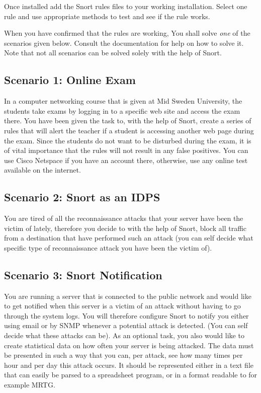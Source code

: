 \documentclass[a4paper,nocourse]{miunasgn}
\begin{document}
Once installed add the Snort rules files to your working installation. 
Select one rule and use appropriate methods to test and see if the rule works.

When you have confirmed that the rules are working, You shall solve \emph{one} 
of the scenarios given below. Consult the documentation \citep{snort} for help 
on how to solve it. Note that not all scenarios can be solved solely with the
help of Snort.

\subsection{Scenario 1: Online Exam}

In a computer networking course that is given at Mid Sweden University, the
students take exams by logging in to a specific web site and access the exam
there. You have been given the task to, with the help of Snort, create a series
of rules that will alert the teacher if a student is accessing another web page
during the exam. Since the students do not want to be disturbed during the exam,
it is of vital importance that the rules will not result in any false
positives. You can use Cisco Netspace if you have an account there, otherwise,
use any online test available on the internet.

\subsection{Scenario 2: Snort as an IDPS}

You are tired of all the reconnaissance attacks that your server have been
the victim of lately, therefore you decide to with the help of Snort, block all
traffic from a destination that have performed such an attack (you can self 
decide what specific type of reconnaissance attack you have been the victim of).

\subsection{Scenario 3: Snort Notification}

You are running a server that is connected to the public network and would like
to get notified when this server is a victim of an attack without having to go
through the system logs. You will therefore configure Snort to notify you
either using email or by SNMP whenever a potential attack is detected.
(You can self decide what these attacks can be). As an optional task, you also
would like to create statistical data on how often your server is being
attacked. The data must be presented in such a way that you can, per attack, 
see how many times per hour and per day this attack occurs. It should be 
represented either in a text file that can easily be parsed to a spreadsheet 
program, or in a format readable to for example MRTG. 
\end{document}
